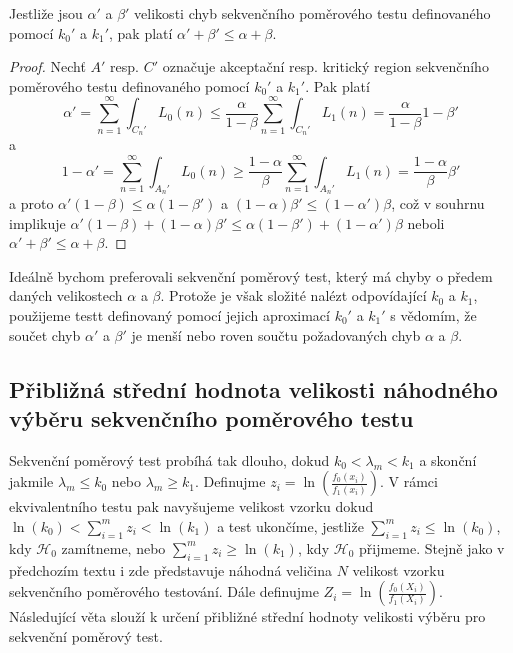 \begin{corollary}
Jestliže jsou $\alpha'$ a $\beta'$ velikosti chyb sekvenčního poměrového testu definovaného pomocí $k_0'$ a $k_1'$, pak platí $\alpha' + \beta' \le \alpha + \beta$.
\end{corollary}

\begin{proof}
Nechť $A'$ resp. $C'$ označuje akceptační resp. kritický region sekvenčního poměrového testu definovaného pomocí $k_0'$ a $k_1'$. Pak platí
\begin{equation*}
\alpha' = \sum_{n = 1}^{\infty} \int_{C_n'} L_0(n) \le \frac{\alpha}{1 - \beta} \sum_{n = 1}^{\infty} \int_{C_n'}L_1(n) = \frac{\alpha}{1 - \beta}{1 - \beta'}
\end{equation*}
a
\begin{equation*}
1 - \alpha' = \sum_{n = 1}^{\infty} \int_{A_n'} L_0(n) \ge \frac{1 - \alpha}{\beta} \sum_{n = 1}^{\infty}\int_{A_n'}L_1(n) = \frac{1 - \alpha}{\beta} \beta'
\end{equation*}
a proto $\alpha'(1 - \beta) \le \alpha(1 - \beta')$ a $(1 - \alpha)\beta' \le (1 - \alpha')\beta$, což v souhrnu implikuje $\alpha'(1 - \beta) + (1 - \alpha)\beta' \le \alpha(1 - \beta') + (1 - \alpha')\beta$ neboli $\alpha' + \beta' \le \alpha + \beta$.
\end{proof}

Ideálně bychom preferovali sekvenční poměrový test, který má chyby o předem daných velikostech $\alpha$ a $\beta$. Protože je však složité nalézt odpovídající $k_0$ a $k_1$, použijeme testt definovaný pomocí jejich aproximací $k_0'$ a $k_1'$ s vědomím, že součet chyb $\alpha'$ a $\beta'$ je menší nebo roven součtu požadovaných chyb $\alpha$ a $\beta$.

\subsection{Přibližná střední hodnota velikosti náhodného výběru sekvenčního poměrového testu}

Sekvenční poměrový test probíhá tak dlouho, dokud $k_0 < \lambda_m < k_1$ a skonční jakmile $\lambda_m \le k_0$ nebo $\lambda_m \ge k_1$. Definujme $z_i = \ln \left(\frac{f_0(x_i)}{f_1(x_i)}\right)$. V rámci ekvivalentního testu pak navyšujeme velikost vzorku dokud $\ln(k_0) < \sum_{i = 1}^m z_i < \ln(k_1)$ a test ukončíme, jestliže $\sum_{i = 1}^m z_i \le \ln(k_0)$, kdy $\mathscr{H}_0$ zamítneme, nebo $\sum_{i = 1}^m z_i \ge \ln(k_1)$, kdy $\mathscr{H}_0$ přijmeme. Stejně jako v předchozím textu i zde představuje náhodná veličina $N$ velikost vzorku sekvenčního poměrového testování. Dále definujme $Z_i = \ln\left(\frac{f_0(X_i)}{f_1(X_i)}\right)$. Následující věta slouží k určení přibližné střední hodnoty velikosti výběru pro sekvenční poměrový test.

